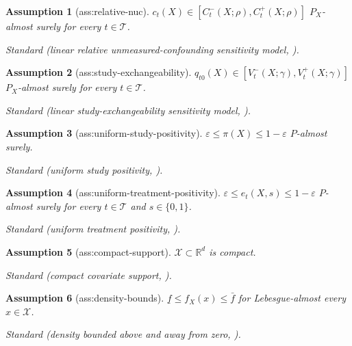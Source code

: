 \documentclass{article}
\newtheorem{assumption}{Assumption}
\begin{document}
\begin{assumption}[ass:relative-nuc]\label{ass:relative-nuc}
\(c_t(X)\in[C_t^-(X;\rho),C_t^+(X;\rho)]\) \(P_X\)-almost surely for every \(t\in\mathcal T\).
\par\smallskip\noindent\emph{Standard} (linear relative unmeasured-confounding sensitivity model, \cite{LannersRudinVolfovskyParikh2025}).
\end{assumption}

\begin{assumption}[ass:study-exchangeability]\label{ass:study-exchangeability}
\(q_{t0}(X)\in[V_t^-(X;\gamma),V_t^+(X;\gamma)]\) \(P_X\)-almost surely for every \(t\in\mathcal T\).
\par\smallskip\noindent\emph{Standard} (linear study-exchangeability sensitivity model, \cite{LannersRudinVolfovskyParikh2025}).
\end{assumption}

\begin{assumption}[ass:uniform-study-positivity]\label{ass:uniform-study-positivity}
\(\varepsilon\le\pi(X)\le1-\varepsilon\) \(P\)-almost surely.
\par\smallskip\noindent\emph{Standard} (uniform study positivity, \cite{LannersRudinVolfovskyParikh2025}).
\end{assumption}

\begin{assumption}[ass:uniform-treatment-positivity]\label{ass:uniform-treatment-positivity}
\(\varepsilon\le e_t(X,s)\le1-\varepsilon\) \(P\)-almost surely for every \(t\in\mathcal T\) and \(s\in\{0,1\}\).
\par\smallskip\noindent\emph{Standard} (uniform treatment positivity, \cite{LannersRudinVolfovskyParikh2025}).
\end{assumption}

\begin{assumption}[ass:compact-support]\label{ass:compact-support}
\(\mathcal X\subset\mathbb R^d\) is compact.
\par\smallskip\noindent\emph{Standard} (compact covariate support, \cite{ChernozhukovEtAl2018DML}).
\end{assumption}

\begin{assumption}[ass:density-bounds]\label{ass:density-bounds}
\(\underline f\le f_X(x)\le\bar f\) for Lebesgue-almost every \(x\in\mathcal X\).
\par\smallskip\noindent\emph{Standard} (density bounded above and away from zero, \cite{ChernozhukovEtAl2018DML}).
\end{assumption}
\end{document}
